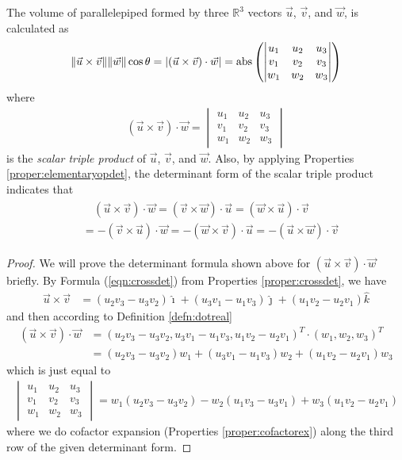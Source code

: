 \begin{proper}
\label{proper:parallelpiped}
The volume of parallelepiped formed by three $\mathbb{R}^3$ vectors $\vec{u}$, $\vec{v}$, and $\vec{w}$, is calculated as
\begin{align}
\norm{\vec{u} \times \vec{v}} \norm{\vec{w}} \cos\theta = |(\vec{u} \times \vec{v}) \cdot \vec{w}| =
\text{abs}\left(
\begin{vmatrix}
u_1 & u_2 & u_3 \\
v_1 & v_2 & v_3 \\
w_1 & w_2 & w_3
\end{vmatrix}\right) \label{eqn:scalartriple}
\end{align}
where
\begin{align}
(\vec{u} \times \vec{v}) \cdot \vec{w} =
\begin{vmatrix}
u_1 & u_2 & u_3 \\
v_1 & v_2 & v_3 \\
w_1 & w_2 & w_3
\end{vmatrix}    
\end{align}
is the \textit{scalar triple product} of $\vec{u}$, $\vec{v}$, and $\vec{w}$. Also, by applying Properties \ref{proper:elementaryopdet}, the determinant form of the scalar triple product indicates that
\begin{align}
\begin{aligned}
&\quad (\vec{u} \times \vec{v}) \cdot \vec{w} = (\vec{v} \times \vec{w}) \cdot \vec{u} = (\vec{w} \times \vec{u}) \cdot \vec{v} \\
&= -(\vec{v} \times \vec{u}) \cdot \vec{w} = -(\vec{w} \times \vec{v}) \cdot \vec{u} = -(\vec{u} \times \vec{w}) \cdot \vec{v}    
\end{aligned}
\end{align}
\end{proper}
\begin{proof}
We will prove the determinant formula shown above for $(\vec{u} \times \vec{v}) \cdot \vec{w}$ briefly. By Formula (\ref{eqn:crossdet}) from Properties \ref{proper:crossdet}, we have
\begin{align*}
\vec{u} \times \vec{v} &= (u_2v_3 - u_3v_2)\hat{\imath} + (u_3v_1 - u_1v_3)\hat{\jmath} + (u_1v_2 - u_2v_1)\hat{k}     
\end{align*}
and then according to Definition \ref{defn:dotreal}
\begin{align*}
(\vec{u} \times \vec{v}) \cdot \vec{w} &= (u_2v_3 - u_3v_2, u_3v_1 - u_1v_3, u_1v_2 - u_2v_1)^T \cdot (w_1, w_2, w_3)^T \\ 
&= (u_2v_3 - u_3v_2)w_1 + (u_3v_1 - u_1v_3)w_2 + (u_1v_2 - u_2v_1)w_3 
\end{align*}
which is just equal to
\begin{align*}
\begin{vmatrix}
u_1 & u_2 & u_3 \\
v_1 & v_2 & v_3 \\
w_1 & w_2 & w_3
\end{vmatrix}
= w_1(u_2v_3 - u_3v_2) - w_2(u_1v_3 - u_3v_1) + w_3(u_1v_2 - u_2v_1) 
\end{align*}
where we do cofactor expansion (Properties \ref{proper:cofactorex}) along the third row of the given determinant form.
\end{proof}

